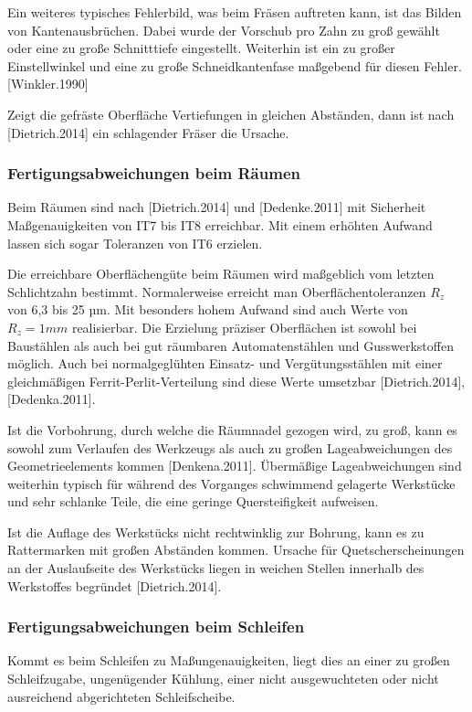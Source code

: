 Ein weiteres typisches Fehlerbild, was beim Fräsen auftreten kann, ist das Bilden von Kantenausbrüchen. Dabei wurde der Vorschub pro Zahn zu groß gewählt oder eine zu große Schnitttiefe eingestellt. Weiterhin ist ein zu großer Einstellwinkel und eine zu große Schneidkantenfase maßgebend für diesen Fehler.[Winkler.1990]

Zeigt die gefräste Oberfläche Vertiefungen in gleichen Abständen, dann ist nach [Dietrich.2014] ein schlagender Fräser die Ursache. 

\subsubsection{Fertigungsabweichungen beim Räumen}

Beim Räumen sind nach [Dietrich.2014] und [Dedenke.2011] mit Sicherheit Maßgenauigkeiten von IT7 bis IT8 erreichbar. Mit einem erhöhten Aufwand lassen sich sogar Toleranzen von IT6 erzielen.

Die erreichbare Oberflächengüte beim Räumen wird maßgeblich vom letzten Schlichtzahn bestimmt.
Normalerweise erreicht man Oberflächentoleranzen $R_{z}$ von 6,3 bis 25 µm. Mit besonders hohem Aufwand sind auch Werte von $R_{z} = 1 mm$ realisierbar. Die Erzielung präziser Oberflächen ist sowohl bei Baustählen als auch bei gut räumbaren Automatenstählen und Gusswerkstoffen möglich. Auch bei normalgeglühten Einsatz- und Vergütungsstählen mit einer gleichmäßigen Ferrit-Perlit-Verteilung sind diese Werte umsetzbar [Dietrich.2014], [Dedenka.2011].       

Ist die Vorbohrung, durch welche die Räumnadel gezogen wird, zu groß, kann es sowohl zum Verlaufen des Werkzeugs als auch zu großen Lageabweichungen des Geometrieelements kommen [Denkena.2011].
Übermäßige Lageabweichungen sind weiterhin typisch für während des Vorganges schwimmend gelagerte Werkstücke und sehr schlanke Teile, die eine geringe Quersteifigkeit aufweisen. 

Ist die Auflage des Werkstücks nicht rechtwinklig zur Bohrung, kann es zu Rattermarken mit großen Abständen kommen. 
Ursache für Quetscherscheinungen an der Auslaufseite des Werkstücks liegen in weichen Stellen innerhalb des Werkstoffes begründet [Dietrich.2014].    

\subsubsection{Fertigungsabweichungen beim Schleifen}

Kommt es beim Schleifen zu Maßungenauigkeiten, liegt dies an einer zu großen Schleifzugabe, ungenügender Kühlung, einer nicht ausgewuchteten oder nicht ausreichend abgerichteten Schleifscheibe. 

